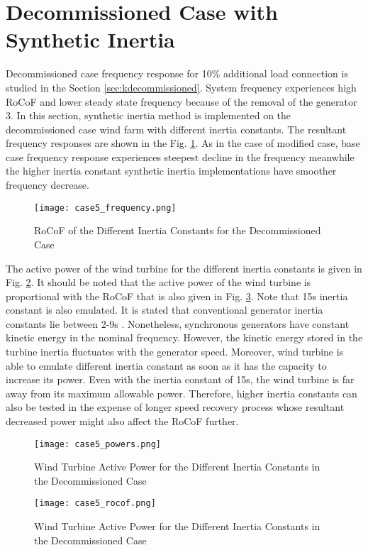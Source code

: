 \section{Decommissioned Case with Synthetic Inertia}
Decommissioned case frequency response for 10\% additional load connection is studied in the Section \ref{sec:kdecommissioned}. System frequency experiences high RoCoF and lower steady state frequency because of the removal of the generator 3. In this section, synthetic inertia method  is implemented on the decommissioned case wind farm with different inertia constants. The resultant frequency responses are shown in the Fig. \ref{Case5_freq}. As in the case of modified case, base case frequency response experiences steepest decline in the frequency meanwhile the higher inertia constant synthetic inertia implementations have smoother frequency decrease.\par
\begin{figure}[h]
	\centering
	\texttt{[image: case5\_frequency.png]}
	\caption{RoCoF of the Different Inertia Constants for the Decommissioned Case}
	\label{Case5_freq}
\end{figure}
The active power of the wind turbine for the different inertia constants is given in Fig. \ref{Case5_power}. It should be noted that the active power of the wind turbine is proportional with the RoCoF that is also given in Fig. \ref{Case5_rocof}. Note that 15s inertia constant is also emulated. It is stated that conventional generator inertia constants lie between 2-9s \cite{Kundur}. Nonetheless, synchronous generators have constant kinetic energy in the nominal frequency. However, the kinetic energy stored in the turbine inertia fluctuates with the generator speed. Moreover, wind turbine is able to emulate different inertia constant as soon as it has the capacity to increase its power. Even with the inertia constant of 15s, the wind turbine is far away from its maximum allowable power. Therefore, higher inertia constants can also be tested in the expense of longer speed recovery process whose resultant decreased power might also affect the RoCoF further. 
\begin{figure}[h]
	\centering
	\texttt{[image: case5\_powers.png]}
	\caption{Wind Turbine Active Power for the Different Inertia Constants in the Decommissioned Case}
	\label{Case5_power}
\end{figure}
\begin{figure}[h!]
	\centering
	\texttt{[image: case5\_rocof.png]}
	\caption{Wind Turbine Active Power for the Different Inertia Constants in the Decommissioned Case}
	\label{Case5_rocof}
\end{figure}
